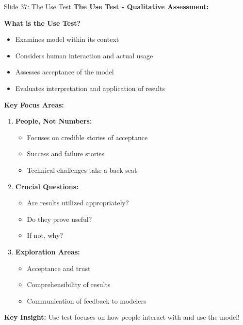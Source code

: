 \documentclass[8pt]{beamer}
\begin{document}
	\begin{frame}{Slide 37: The Use Test}
		\fontsize{6.5}{7.5}\selectfont
		\textbf{The Use Test - Qualitative Assessment:}
		
		\vspace{0.1cm}
		\textbf{What is the Use Test?}
		\begin{itemize}
			\item Examines model within its context
			\item Considers human interaction and actual usage
			\item Assesses acceptance of the model
			\item Evaluates interpretation and application of results
		\end{itemize}
		
		\vspace{0.1cm}
		\textbf{Key Focus Areas:}
		\begin{enumerate}
			\item \textbf{People, Not Numbers:}
			\begin{itemize}
				\item Focuses on credible stories of acceptance
				\item Success and failure stories
				\item Technical challenges take a back seat
			\end{itemize}
			\item \textbf{Crucial Questions:}
			\begin{itemize}
				\item Are results utilized appropriately?
				\item Do they prove useful?
				\item If not, why?
			\end{itemize}
			\item \textbf{Exploration Areas:}
			\begin{itemize}
				\item Acceptance and trust
				\item Comprehensibility of results
				\item Communication of feedback to modelers
			\end{itemize}
		\end{enumerate}
		
		\textcolor{myblue}{\textbf{Key Insight:}} Use test focuses on \textcolor{myblue}{how people interact with and use the model}!
	\end{frame}
	
\end{document}
